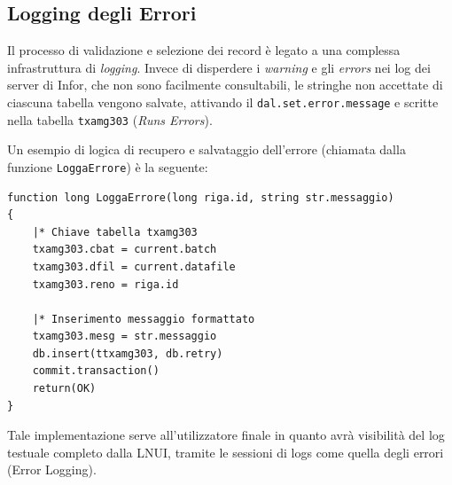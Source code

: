 \subsection{Logging degli Errori}\label{subsec:logging-degli-errori}
Il processo di validazione e selezione dei record è legato a una complessa infrastruttura di \textit{logging}.
Invece di disperdere i \textit{warning} e gli \textit{errors} nei log dei server di Infor, che non sono facilmente consultabili,
le stringhe non accettate di ciascuna tabella vengono salvate, attivando il \texttt{dal.set.error.message} e scritte nella tabella \texttt{txamg303} (\textit{Runs Errors}).

Un esempio di logica di recupero e salvataggio dell'errore (chiamata dalla funzione \texttt{LoggaErrore}) è la seguente:

\begin{listing}[H]
\begin{verbatim}
function long LoggaErrore(long riga.id, string str.messaggio)
{
    |* Chiave tabella txamg303 
    txamg303.cbat = current.batch
    txamg303.dfil = current.datafile
    txamg303.reno = riga.id
    
    |* Inserimento messaggio formattato
    txamg303.mesg = str.messaggio
    db.insert(ttxamg303, db.retry)
    commit.transaction()
    return(OK)
}
\end{verbatim}
\caption{Snippet dimostrativo di inserimento del log di errore scaturito dal livello DAL interno.}
\label{lst:error_logging}
\end{listing}

Tale implementazione serve all'utilizzatore finale in quanto avrà visibilità del log testuale completo dalla LNUI, tramite
le sessioni di logs come quella degli errori (Error Logging)\@.

